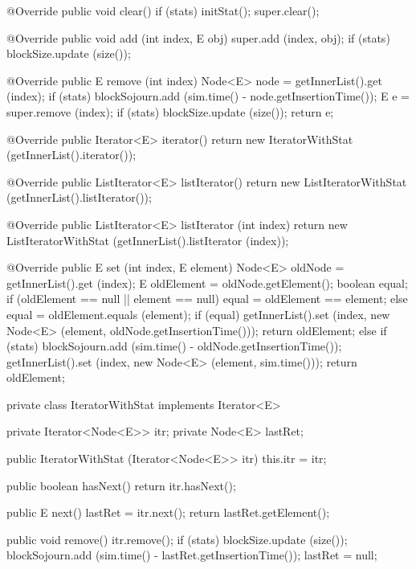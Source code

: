 \begin{code}\begin{hide}

   @Override
   public void clear() {
      if (stats)
         initStat();
      super.clear();
   }

   @Override
   public void add (int index, E obj)  {
      super.add (index, obj);
      if (stats)
         blockSize.update (size());
   }

   @Override
   public E remove (int index) {
      Node<E> node = getInnerList().get (index);
      if (stats)
         blockSojourn.add (sim.time() - node.getInsertionTime());
      E e = super.remove (index);
      if (stats)
         blockSize.update (size());
      return e;
   }

   @Override
   public Iterator<E> iterator() {
      return new IteratorWithStat (getInnerList().iterator());
   }

   @Override
   public ListIterator<E> listIterator() {
      return new ListIteratorWithStat (getInnerList().listIterator());
   }

   @Override
   public ListIterator<E> listIterator (int index) {
      return new ListIteratorWithStat (getInnerList().listIterator (index));
   }

   @Override
   public E set (int index, E element) {
      Node<E> oldNode = getInnerList().get (index);
      E oldElement = oldNode.getElement();
      boolean equal;
      if (oldElement == null || element == null)
         equal = oldElement == element;
      else
         equal = oldElement.equals (element);
      if (equal) {
         getInnerList().set (index, new Node<E> (element, oldNode.getInsertionTime()));
         return oldElement;
      }
      else {
         if (stats)
            blockSojourn.add (sim.time() - oldNode.getInsertionTime());
         getInnerList().set (index, new Node<E> (element, sim.time()));
         return oldElement;
      }
   }

   private class IteratorWithStat implements Iterator<E> {
      private Iterator<Node<E>> itr;
      private Node<E> lastRet;

      public IteratorWithStat (Iterator<Node<E>> itr) {
         this.itr = itr;
      }

      public boolean hasNext() {
         return itr.hasNext();
      }

      public E next() {
         lastRet = itr.next();
         return lastRet.getElement();
      }

      public void remove() {
         itr.remove();
         if (stats) {
            blockSize.update (size());
            blockSojourn.add (sim.time() - lastRet.getInsertionTime());
         }
         lastRet = null;
      }
   }


\end{hide}
\end{code}
